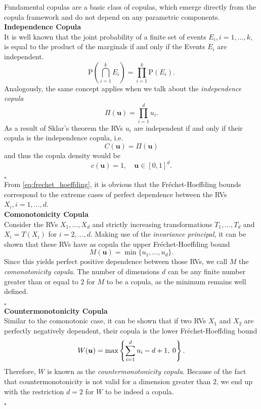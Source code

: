 
Fundamental copulas are a basic class of copulas, which emerge directly from the copula framework and do not depend on any parametric components. \\

\textbf{Independence Copula}\\
It is well known that the joint probability of a finite set of events
$E_i, i = 1, \ldots, k$, is equal to the product of the marginals if and only if the Events $E_i$ are independent.
$$\mathrm{P}\left(\bigcap_{i=1}^{k} E_{i}\right)=\prod_{i=1}^{k} \mathrm{P}\left(E_{i}\right).$$
Analogously, the same concept applies when we talk about the \textit{independence copula}
\begin{equation}
\Pi (\bm{u}) = \prod \limits _{i = 1}^d u_i.
\end{equation}
As a result of Sklar's theorem the \ac{RV}s $u_i$ are independent if and only if their copula is the independence copula, i.e.
$$ C(\bm{u}) = \Pi (\bm{u}) $$
and thus the copula density would be 
$$c(\boldsymbol{u})=1, \quad \boldsymbol{u} \in[0,1]^{d}.$$

\hfill $\square$ \\


From \autoref{eq:frechet_hoeffding}, it is obvious that the Fr\'echet-Hoeffding bounds correspond to the extreme cases of perfect dependence between the \ac{RV}s $X_i, i = 1, \ldots, d$. \\

\textbf{Comonotonicity Copula}\\
Consider the \ac{RV}s $X_1, \ldots, X_d$ and strictly increasing transformations $T_1, \ldots, T_d$ and $X_i = T(X_i)$ for $i = 2, \ldots, d$. Making use of the \textit{invariance principal}, it can be shown that these \ac{RV}s have as copula the upper Fr\'echet-Hoeffding bound 
$$M(\bm{u}) = \min\{ u_1, \ldots, u_d \}.$$ Since this yields perfect positive dependence between those \ac{RV}s, we call $M$ the \textit{comonotonicity copula}. The number of dimensions $d$ can be any finite number greater than or equal to $2$ for $M$ to be a copula, as the minimum remains well defined.

\hfill $\square$ \\



\textbf{Countermonotonicity Copula}\\
Similar to the comonotonic case, it can be shown that if two \acp{RV} $X_1$ and $X_2$ are perfectly negatively dependent, their copula is the lower Fr\'echet-Hoeffding bound
$$
W(\boldsymbol{u})=\max \left\{\sum\limits_{i=1}^{d} u_{i}-d+1, \hspace{0.25em} 0\right\}.
$$
Therefore, $W$ is known as the \textit{countermonotonicity copula}. Because of the fact that countermonotonicity is not valid for a dimension greater than $2$, we end up with the restriction $d=2$ for $W$ to be indeed a copula.

\hfill $\square$ \\








